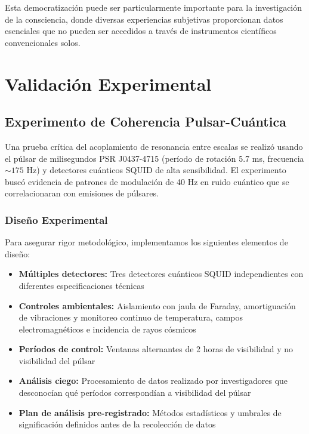 \documentclass[12pt]{article}
\begin{document}
Esta democratización puede ser particularmente importante para la investigación de la consciencia, donde diversas experiencias subjetivas proporcionan datos esenciales que no pueden ser accedidos a través de instrumentos científicos convencionales solos.

\section{Validación Experimental}

\subsection{Experimento de Coherencia Pulsar-Cuántica}

Una prueba crítica del acoplamiento de resonancia entre escalas se realizó usando el púlsar de milisegundos PSR J0437-4715 (período de rotación 5.7 ms, frecuencia $\sim 175$ Hz) y detectores cuánticos SQUID de alta sensibilidad. El experimento buscó evidencia de patrones de modulación de 40 Hz en ruido cuántico que se correlacionaran con emisiones de púlsares.

\subsubsection{Diseño Experimental}
Para asegurar rigor metodológico, implementamos los siguientes elementos de diseño:

\begin{itemize}
    \item \textbf{Múltiples detectores:} Tres detectores cuánticos SQUID independientes con diferentes especificaciones técnicas
    \item \textbf{Controles ambientales:} Aislamiento con jaula de Faraday, amortiguación de vibraciones y monitoreo continuo de temperatura, campos electromagnéticos e incidencia de rayos cósmicos
    \item \textbf{Períodos de control:} Ventanas alternantes de 2 horas de visibilidad y no visibilidad del púlsar
    \item \textbf{Análisis ciego:} Procesamiento de datos realizado por investigadores que desconocían qué períodos correspondían a visibilidad del púlsar
    \item \textbf{Plan de análisis pre-registrado:} Métodos estadísticos y umbrales de significación definidos antes de la recolección de datos
\end{itemize}
\end{document}
